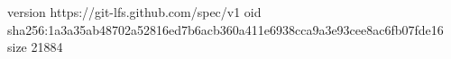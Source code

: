 version https://git-lfs.github.com/spec/v1
oid sha256:1a3a35ab48702a52816ed7b6acb360a411e6938cca9a3e93cee8ac6fb07fde16
size 21884
